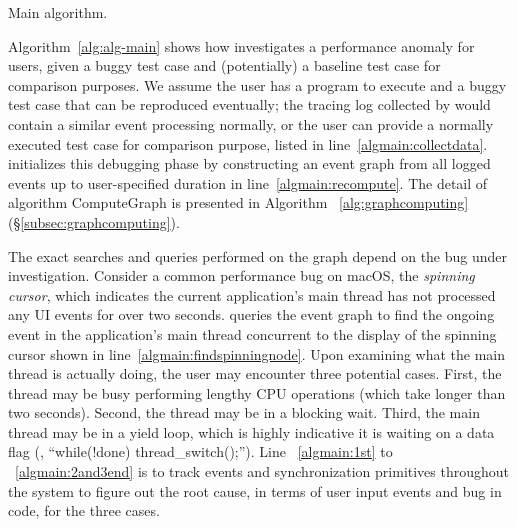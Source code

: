 \begin{algorithm}[ht!]
    \caption{Main \xxx algorithm.}
    \label{alg:alg-main}
\begin{algorithmic}[1]
\Statex
{}
\label{algmain:collectdata}
\label{algmain:recompute}
\label{algmain:findspinningnode}
	\label{algmain:1st}
\Else
	\label{algmain:2and3begin}
		\State {}
	\EndIf\label{algmain:2and3end}
\EndIf
{}
\EndFunction
\end{algorithmic}
\end{algorithm}

Algorithm~\ref{alg:alg-main} shows how \xxx investigates a performance anomaly
for users, given a buggy test case and (potentially) a baseline test case
for comparison purposes. We assume the user has a program to execute and a
buggy test case that can be reproduced eventually; the tracing log collected
by \xxx would contain a similar event processing normally, or the user can
provide a normally executed test case for comparison purpose, listed in
line~\ref{algmain:collectdata}. \xxx initializes this debugging phase by
constructing an event graph from all logged events up to user-specified duration
in line~\ref{algmain:recompute}. The detail of algorithm ComputeGraph is
presented in Algorithm ~\ref{alg:graphcomputing}(\S\ref{subsec:graphcomputing}).

The exact searches and queries performed on the graph depend on the bug under
investigation. Consider a common performance bug on macOS, the \emph{spinning
cursor}, which indicates the current application's main thread has not processed
any UI events for over two seconds. \xxx queries the event graph to find the
ongoing event in the application's main thread concurrent to the display of
the spinning cursor shown in line~\ref{algmain:findspinningnode}. Upon examining
what the main thread is actually doing, the user may encounter three potential
cases. First, the thread may be busy performing lengthy CPU operations (which
take longer than two seconds). Second, the thread may be in a blocking wait.
Third, the main thread may be in a yield loop, which is highly indicative
it is waiting on a data flag (\eg, ``while(!done) thread\_switch();'').
Line ~\ref{algmain:1st} to ~\ref{algmain:2and3end} is to track events and
synchronization primitives throughout the system to figure out the root cause,
in terms of user input events and bug in code, for the three cases.

